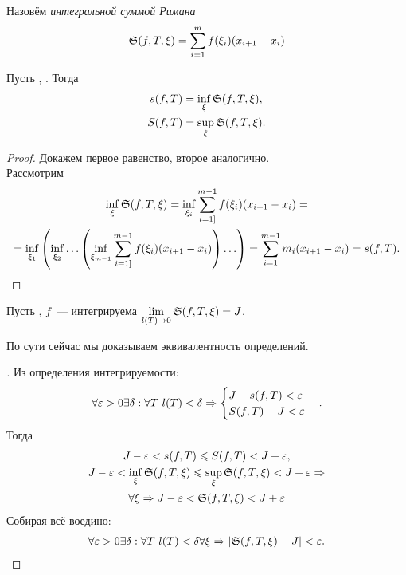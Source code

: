 \documentclass[../main.tex]{subfiles}
\begin{document}
\begin{definition}
    Назовём \emph{интегральной суммой Римана} 
    \begin{gather*}
        \mathfrak{S} (f, T, \xi) = \sum_{i=1}^m f(\xi_i) (x_{i+1} - x_{i})
    \end{gather*}
\end{definition}

\begin{proposition}
    Пусть \fabr, \tpab. Тогда 
    \begin{align*}
        s(f,T) &= \inf_\xi \mathfrak{S}(f,T,\xi), \\
        S(f,T) &= \sup_\xi \mathfrak{S}(f,T,\xi).
    \end{align*}
\end{proposition}

\begin{proof}
    Докажем первое равенство, второе аналогично.\\ Рассмотрим
    \begin{gather*}
        \inf_\xi \mathfrak{S} (f, T, \xi) = \inf_{\xi_i} \sum_{i=1]}^{m-1} f(\xi_i)(x_{i+1} - x_i) = \\ = 
        \inf_{\xi_1} \left(\inf_{\xi_2} \ldots \left(\inf_{\xi_{m-1}} \sum_{i=1]}^{m-1} f(\xi_i)(x_{i+1} - x_i)\right)\ldots\right) = \sum_{i=1}^{m-1} m_i(x_{i+1} - x_i) = s(f, T).
    \end{gather*}
\end{proof}

\begin{proposition}
    Пусть \fabr, $f$~--- интегрируема \nas $\lim\limits_{l(T)\to 0} \mathfrak{S} (f, T, \xi) = J$. 
\end{proposition}

\begin{note}
    По сути сейчас мы доказываем эквивалентность определений.
\end{note}

\begin{proof}[\circled{\hence}]
    Из определения интегрируемости:
    \begin{gather*}
        \forall \varepsilon > 0 \exists \delta : \forall T\ l(T) < \delta \Rightarrow \begin{cases}J - s(f,T) < \varepsilon \\ S(f, T) - J < \varepsilon\end{cases}.
    \end{gather*}
    Тогда 
    \begin{gather*}
        J - \varepsilon < s(f, T) \leqslant S(f, T) < J + \varepsilon, \\
        J - \varepsilon < \inf_\xi \mathfrak{S}(f, T, \xi) \leqslant \sup_\xi \mathfrak{S}(f, T, \xi) < J + \varepsilon \Rightarrow \\
        \forall \xi \Rightarrow J - \varepsilon < \mathfrak{S} (f, T, \xi) < J + \varepsilon
    \end{gather*}
    Собирая всё воедино:
    \begin{gather*}
        \forall \varepsilon > 0 \exists \delta : \forall T\ l(T) < \delta \forall \xi \Rightarrow |\mathfrak{S}(f, T, \xi) - J| < \varepsilon.
    \end{gather*}
\end{proof}
\end{document}
